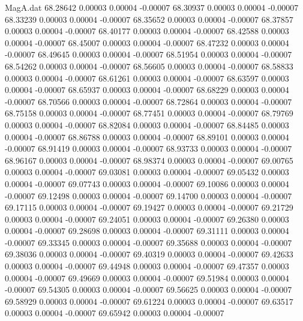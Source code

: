 \begin{filecontents}{MagA.dat}
  68.28642    0.00003    0.00004   -0.00007
  68.30937    0.00003    0.00004   -0.00007
  68.33239    0.00003    0.00004   -0.00007
  68.35652    0.00003    0.00004   -0.00007
  68.37857    0.00003    0.00004   -0.00007
  68.40177    0.00003    0.00004   -0.00007
  68.42588    0.00003    0.00004   -0.00007
  68.45007    0.00003    0.00004   -0.00007
  68.47232    0.00003    0.00004   -0.00007
  68.49645    0.00003    0.00004   -0.00007
  68.51954    0.00003    0.00004   -0.00007
  68.54262    0.00003    0.00004   -0.00007
  68.56605    0.00003    0.00004   -0.00007
  68.58833    0.00003    0.00004   -0.00007
  68.61261    0.00003    0.00004   -0.00007
  68.63597    0.00003    0.00004   -0.00007
  68.65937    0.00003    0.00004   -0.00007
  68.68229    0.00003    0.00004   -0.00007
  68.70566    0.00003    0.00004   -0.00007
  68.72864    0.00003    0.00004   -0.00007
  68.75158    0.00003    0.00004   -0.00007
  68.77451    0.00003    0.00004   -0.00007
  68.79769    0.00003    0.00004   -0.00007
  68.82084    0.00003    0.00004   -0.00007
  68.84485    0.00003    0.00004   -0.00007
  68.86788    0.00003    0.00004   -0.00007
  68.89101    0.00003    0.00004   -0.00007
  68.91419    0.00003    0.00004   -0.00007
  68.93733    0.00003    0.00004   -0.00007
  68.96167    0.00003    0.00004   -0.00007
  68.98374    0.00003    0.00004   -0.00007
  69.00765    0.00003    0.00004   -0.00007
  69.03081    0.00003    0.00004   -0.00007
  69.05432    0.00003    0.00004   -0.00007
  69.07743    0.00003    0.00004   -0.00007
  69.10086    0.00003    0.00004   -0.00007
  69.12498    0.00003    0.00004   -0.00007
  69.14700    0.00003    0.00004   -0.00007
  69.17115    0.00003    0.00004   -0.00007
  69.19427    0.00003    0.00004   -0.00007
  69.21729    0.00003    0.00004   -0.00007
  69.24051    0.00003    0.00004   -0.00007
  69.26380    0.00003    0.00004   -0.00007
  69.28698    0.00003    0.00004   -0.00007
  69.31111    0.00003    0.00004   -0.00007
  69.33345    0.00003    0.00004   -0.00007
  69.35688    0.00003    0.00004   -0.00007
  69.38036    0.00003    0.00004   -0.00007
  69.40319    0.00003    0.00004   -0.00007
  69.42633    0.00003    0.00004   -0.00007
  69.44948    0.00003    0.00004   -0.00007
  69.47357    0.00003    0.00004   -0.00007
  69.49669    0.00003    0.00004   -0.00007
  69.51984    0.00003    0.00004   -0.00007
  69.54305    0.00003    0.00004   -0.00007
  69.56625    0.00003    0.00004   -0.00007
  69.58929    0.00003    0.00004   -0.00007
  69.61224    0.00003    0.00004   -0.00007
  69.63517    0.00003    0.00004   -0.00007
  69.65942    0.00003    0.00004   -0.00007

\end{filecontents}

